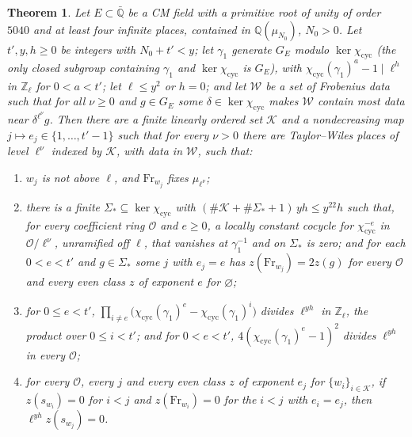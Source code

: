 \documentclass[reqno]{amsart}
\theoremstyle{definition}
\theoremstyle{plain}
\newtheorem{theorem}{Theorem}[section]
\newcommand{\Z}{\mathbb{Z}}
\newcommand{\Q}{\mathbb{Q}}
\newcommand{\Oc}{\mathcal{O}}
\newcommand{\Kc}{\mathcal{K}}
\newcommand{\cyc}{\chi_{\mathrm{cyc}}}
\newcommand{\Fr}{\mathrm{Fr}}
\begin{document}
\begin{theorem}\label{thm:triangle}
Let \(E \subset \bar{\Q}\) be a CM field with a primitive root of unity of order \(5040\) and at least four infinite places, contained in \(\Q(\mu_{N_0})\), \(N_0 > 0\).  Let \(t', y, h \ge 0\) be integers with \(N_0 + t' < y\); let \(\gamma_1\) generate \(G_E\) modulo \(\ker\cyc\) (the only closed subgroup containing \(\gamma_1\) and \(\ker\cyc\) is \(G_E\)), with \(\cyc(\gamma_1)^a - 1 \mid \ell^h\) in \(\Z_\ell\) for \(0 < a < t'\); let \(\ell \le y^2\) or \(h = 0\); and let \(\mathcal W\) be a set of Frobenius data such that for all \(\nu \ge 0\) and \(g \in G_E\) some \(\delta \in \ker\cyc\) makes \(\mathcal W\) contain most data near \(\delta^{\ell^\nu}g\).  Then there are a finite linearly ordered set \(\Kc\) and a nondecreasing map \(j \mapsto e_j \in \{1, \dots, t'-1\}\) such that for every \(\nu > 0\) there are Taylor--Wiles places of level \(\ell^\nu\) indexed by \(\Kc\), with data in \(\mathcal W\), such that:
\begin{enumerate}
\item[(a)] \(w_j\) is not above \(\ell\), and \(\Fr_{w_j}\) fixes \(\mu_{\ell^\nu}\);
\item[(b)] there is a finite \(\Sigma_* \subseteq \ker\cyc\) with \((\#\Kc + \#\Sigma_* + 1)\,yh \le y^{22}h\) such that, for every coefficient ring \(\Oc\) and \(e \ge 0\), a locally constant cocycle for \(\cyc^{-e}\) in \(\Oc/\ell^\nu\), unramified off \(\ell\), that vanishes at \(\gamma_1^{-1}\) and on \(\Sigma_*\) is zero; and for each \(0 < e < t'\) and \(g \in \Sigma_*\) some \(j\) with \(e_j = e\) has \(z(\Fr_{w_j}) = 2z(g)\) for every \(\Oc\) and every even class \(z\) of exponent \(e\) for \(\varnothing\);
\item[(c)] for \(0 \le e < t'\), \(\prod_{i \ne e}\bigl(\cyc(\gamma_1)^{e} - \cyc(\gamma_1)^{i}\bigr)\) divides \(\ell^{yh}\) in \(\Z_\ell\), the product over \(0 \le i < t'\); and for \(0 < e < t'\), \(4(\cyc(\gamma_1)^e - 1)^2\) divides \(\ell^{yh}\) in every \(\Oc\);
\item[(d)] for every \(\Oc\), every \(j\) and every even class \(z\) of exponent \(e_j\) for \(\{w_i\}_{i \in \Kc}\), if \(z(s_{w_i}) = 0\) for \(i < j\) and \(z(\Fr_{w_i}) = 0\) for the \(i < j\) with \(e_i = e_j\), then \(\ell^{yh}z(s_{w_j}) = 0\).
\end{enumerate}
\end{theorem}
\end{document}
